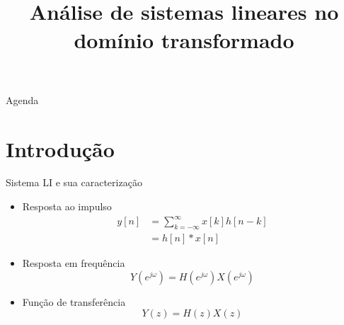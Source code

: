 


\title{\cursogrande\\ \vspace{1cm}Análise de sistemas lineares no domínio transformado}



\maketitle[randomdots={false}]
   \begin{slide}{Agenda}
      \tableofcontents[content=sections]
   \end{slide}

\section{Introdução}
\begin{slide}{Sistema LI e sua caracterização}
\begin{itemize}
   \item Resposta ao impulso
	   \begin{align*}
		   y[n] &= \sum_{k=-\infty}^{\infty}x[k] h[n-k]\\
		        &= h[n]\ast x[n]
	   \end{align*}
   \item Resposta em frequência
	   \begin{equation*}
		   Y(e^{j\omega}) = H(e^{j\omega})X(e^{j\omega})
	   \end{equation*}
   \item Função de transferência
	   \begin{equation*}
		   Y(z) = H(z)X(z)
	   \end{equation*}
\end{itemize}
\end{slide}

